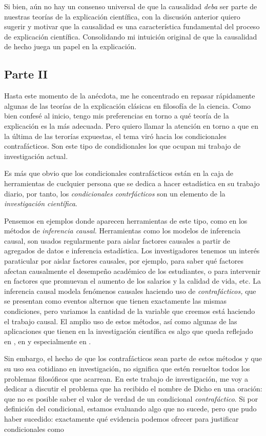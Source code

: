 Si bien, aún no hay un consenso universal de que la causalidad
\emph{deba} ser parte de nuestras teorías de la explicación
científica, con la discusión anterior quiero sugerir y motivar que la
causalidad es una característica fundamental del proceso de
explicación científica. Consolidando mi intuición original de que la
causalidad de hecho juega un papel en la explicación.

\subsection{Parte II}

\noindent Hasta este momento de la anécdota, me he concentrado en repasar
rápidamente algunas de las teorías de la explicación clásicas en
filosofía de la ciencia. Como bien confesé al inicio, tengo mis
preferencias en torno a qué teoría de la explicación es la más
adecuada. Pero quiero llamar la atención en torno a que en la última
de las terorías expuestas, el tema viró hacia los condicionales
contrafácticos. Son este tipo de condidionales los que ocupan mi trabajo de investigación actual.

Es más que obvio que los condicionales contrafácticos están en la
caja de herramientas de cuclquier persona que se dedica a hacer
estadística en su trabajo diario, por tanto, los \emph{condicionales
contrfácticos} son un elemento de la \emph{investigación científica}.

Pensemos en ejemplos donde aparecen herramientas de este tipo, como
en los métodos de \emph{inferencia causal.} Herramientas como los
modelos de inferencia causal, son usados regularmente para aislar
factores causales a partir de agregados de datos e inferencia
estadística. Los investigadores tenemos un interés paraticular por
aislar factores causales, por ejemplo, para saber qué factores
afectan causalmente el desempeño académico de los estudiantes, o para
intervenir en factores que promuevan el aumento de los salarios y la
calidad de vida, etc. La inferencia causal modela fenómenos causales
haciendo uso de \emph{contrafácticos,} que se presentan como eventos
alternos que tienen exactamente las mismas condiciones, pero variamos
la cantidad de la variable que creemos está haciendo el trabajo
causal. El amplio uso de estos métodos, así como algunas de las
aplicaciones que tienen en la investigación científica es algo que
queda reflejado en \parencite{Pearl2016}, en \parencite{Pearl2018} y
especialmente en \parencite{llaudet2023}.

Sin embargo, el hecho de que los contrafácticos sean parte de estos
métodos y que su uso sea cotidiano en investigación, no significa que
estén resueltos todos los problemas filosóficos que acarrean. En este trabajo de
investigación, me voy a dedicar a discutir el problema que ha recibido el nombre de  Dicho en una oración: que no es posible saber
el valor de verdad de un condicional \emph{contrafáctico}. Si por definición del condicional,
estamos evaluando algo que no sucede, pero que pudo haber sucedido: exactamente qué evidencia
podemos ofrecer para justificar condicionales como 

